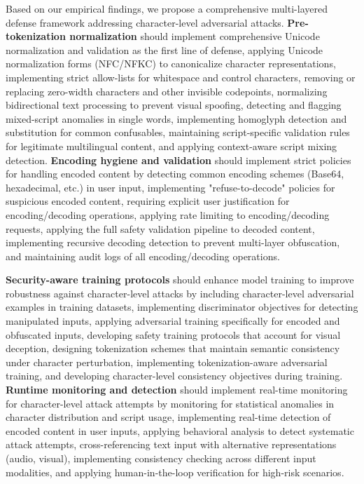 \documentclass[11pt]{article}
\begin{document}
\begin{multicols}{2}
Based on our empirical findings, we propose a comprehensive multi-layered defense framework addressing character-level adversarial attacks. \textbf{Pre-tokenization normalization} should implement comprehensive Unicode normalization and validation as the first line of defense, applying Unicode normalization forms (NFC/NFKC) to canonicalize character representations, implementing strict allow-lists for whitespace and control characters, removing or replacing zero-width characters and other invisible codepoints, normalizing bidirectional text processing to prevent visual spoofing, detecting and flagging mixed-script anomalies in single words, implementing homoglyph detection and substitution for common confusables, maintaining script-specific validation rules for legitimate multilingual content, and applying context-aware script mixing detection. \textbf{Encoding hygiene and validation} should implement strict policies for handling encoded content by detecting common encoding schemes (Base64, hexadecimal, etc.) in user input, implementing "refuse-to-decode" policies for suspicious encoded content, requiring explicit user justification for encoding/decoding operations, applying rate limiting to encoding/decoding requests, applying the full safety validation pipeline to decoded content, implementing recursive decoding detection to prevent multi-layer obfuscation, and maintaining audit logs of all encoding/decoding operations.

\textbf{Security-aware training protocols} should enhance model training to improve robustness against character-level attacks by including character-level adversarial examples in training datasets, implementing discriminator objectives for detecting manipulated inputs, applying adversarial training specifically for encoded and obfuscated inputs, developing safety training protocols that account for visual deception, designing tokenization schemes that maintain semantic consistency under character perturbation, implementing tokenization-aware adversarial training, and developing character-level consistency objectives during training. \textbf{Runtime monitoring and detection} should implement real-time monitoring for character-level attack attempts by monitoring for statistical anomalies in character distribution and script usage, implementing real-time detection of encoded content in user inputs, applying behavioral analysis to detect systematic attack attempts, cross-referencing text input with alternative representations (audio, visual), implementing consistency checking across different input modalities, and applying human-in-the-loop verification for high-risk scenarios.


\end{multicols}
\end{document}
